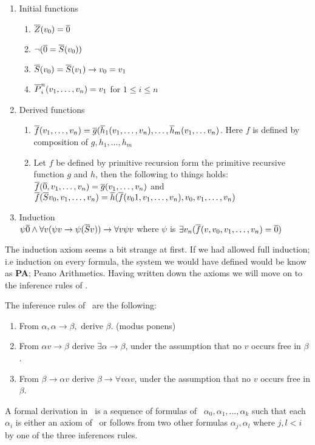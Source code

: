\documentclass[../main.tex]{subfiles}
\begin{document}
\begin{defi}
\begin{enumerate}
			\begin{enumerate}
				\item Initial functions
					\begin{enumerate}
						\item $\overline{Z}(v_0)=\overline{0}$
						\item $\neg(\overline{0} =\overline S(v_0))$
						\item $\overline S(v_0)=\overline
							S(v_1)\rightarrow
							v_0=v_1$
						\item $\overline
							P^n_i(v_1,\ldots,v_n)=v_1$
							for $1\leq i\leq n$
					\end{enumerate}
				\item Derived functions
					\begin{enumerate}
						\item $\overline
							f(v_1,\ldots,v_n)=\overline
							g(\overline
							h_1(v_1,\ldots,v_n),\ldots,\overline
							h_m(v_1,\ldots v_n)$.
							Here $f$ is defined by
							composition of
							$g,h_1,\ldots, h_m$
						\item Let $f$ be defined by
							primitive recursion
							form the primitive
							recursive function $g$
							and $h$, then the
							following to things
							holds:\\
							$\overline
							f(\overline{0},v_1,\ldots,v_n)=\overline
							g(v_1,\ldots, v_n)$
							and\\
							$\overline f(\overline
							Sv_0,v_1,\ldots,v_n)=\overline
							h(\overline
							f(v_01,v_1,\ldots,v_n),v_0,v_1,\ldots,v_n)$
					\end{enumerate}
				\item Induction\\
					$\psi\overline{0}\wedge\forall v(\psi
					v\rightarrow \psi (\overline Sv))\rightarrow
					\forall v\psi v$ where $\psi$ is
					$\exists v_n(\overline
					f(v,v_0,v_1,\ldots,v_n)=\overline 0)$
			\end{enumerate}
	\end{enumerate}
\end{defi}
The induction axiom seems a bit strange at first. If we had allowed full
induction; i.e induction on every formula, the system we would have defined
would be know as \textbf{PA}; Peano Arithmetics.  Having written down the axioms we will move on to the
inference rules of \PRA.
\begin{defi}
	The inference rules of \PRA\ are the following:
	\begin{enumerate}
		\item From $\alpha,\alpha\rightarrow\beta,$ derive $\beta$.
			(modus ponens)
		\item From $\alpha v\rightarrow \beta$ derive $\exists
			\alpha\rightarrow \beta$, under the assumption that no
			$v$ occurs free in $\beta$.
		\item From $\beta\rightarrow \alpha v$ derive $\beta\rightarrow
			\forall v\alpha v$, under the assumption that no
			$v$ occurs free in $\beta$.
	\end{enumerate}
	A formal derivation in \PRA\ is a sequence of formulas of \PRA\
	$\alpha_0,\alpha_1,\ldots,\alpha_k$ such that each $\alpha_i$ is either
	an axiom of \PRA\ or follows from two other formulas $\alpha_j,\alpha_l$
	where $j,l<i$ by one of the three inferences rules.
\end{defi}
\end{document}

